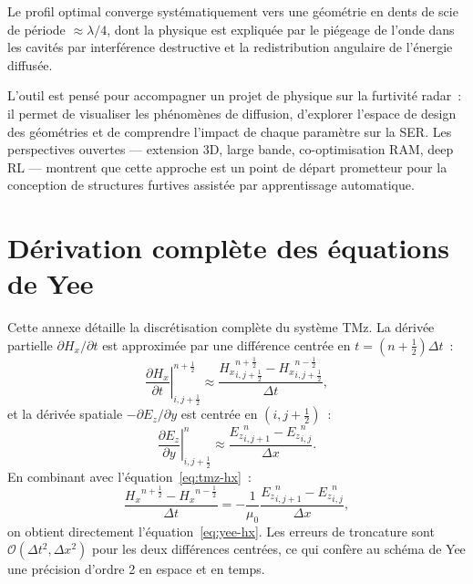 \documentclass[12pt,a4paper]{article}
\newcommand{\Ez}{{E_z}}
\newcommand{\Hx}{{H_x}}
\newcommand{\muo}{\mu_0}
\newcommand{\dx}{\Delta x}
\newcommand{\dt}{\Delta t}
\newcommand{\half}{\tfrac{1}{2}}
\begin{document}
Le profil optimal converge systématiquement vers une géométrie en dents de scie
de période $\approx \lambda/4$, dont la physique est expliquée par le piégeage
de l'onde dans les cavités par interférence destructive et la redistribution
angulaire de l'énergie diffusée.

L'outil est pensé pour accompagner un projet de physique sur la furtivité radar~:
il permet de visualiser les phénomènes de diffusion, d'explorer l'espace de design
des géométries et de comprendre l'impact de chaque paramètre sur la SER.
Les perspectives ouvertes --- extension 3D, large bande, co-optimisation RAM,
deep RL --- montrent que cette approche est un point de départ prometteur pour
la conception de structures furtives assistée par apprentissage automatique.

\newpage

\appendix

\section{Dérivation complète des équations de Yee}
\label{app:yee}

Cette annexe détaille la discrétisation complète du système TMz.
La dérivée partielle $\partial \Hx / \partial t$ est approximée par une différence
centrée en $t = (n+\half)\dt$~:
\begin{equation}
    \left.\frac{\partial \Hx}{\partial t}\right|^{n+\half}_{i,j+\half} \approx
    \frac{\Hx^{n+\half}_{i,j+\half} - \Hx^{n-\half}_{i,j+\half}}{\dt},
\end{equation}
et la dérivée spatiale $-\partial \Ez / \partial y$ est centrée en $(i, j+\half)$~:
\begin{equation}
    \left.\frac{\partial \Ez}{\partial y}\right|^n_{i,j+\half} \approx
    \frac{\Ez^n_{i,j+1} - \Ez^n_{i,j}}{\dx}.
\end{equation}
En combinant avec l'équation~\eqref{eq:tmz-hx}~:
\begin{equation}
    \frac{\Hx^{n+\half} - \Hx^{n-\half}}{\dt} = -\frac{1}{\muo}
    \frac{\Ez^n_{i,j+1} - \Ez^n_{i,j}}{\dx},
\end{equation}
on obtient directement l'équation~\eqref{eq:yee-hx}. Les erreurs de troncature
sont $\mathcal{O}(\dt^2, \dx^2)$ pour les deux différences centrées, ce qui confère
au schéma de Yee une précision d'ordre 2 en espace et en temps.
\end{document}
